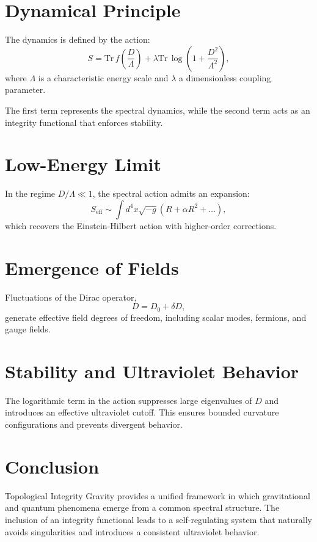 \documentclass[11pt,a4paper]{article}
\begin{document}
\section{Dynamical Principle}

The dynamics is defined by the action:
\begin{equation}
S = \mathrm{Tr}\, f\left(\frac{D}{\Lambda}\right) + \lambda \mathrm{Tr}\,\log\left(1 + \frac{D^2}{\Lambda^2}\right),
\end{equation}
where $\Lambda$ is a characteristic energy scale and $\lambda$ a dimensionless coupling parameter.

The first term represents the spectral dynamics, while the second term acts as an integrity functional that enforces stability.

\section{Low-Energy Limit}

In the regime $D/\Lambda \ll 1$, the spectral action admits an expansion:
\begin{equation}
S_{\mathrm{eff}} \sim \int d^4x \sqrt{-g} \left( R + \alpha R^2 + \dots \right),
\end{equation}
which recovers the Einstein-Hilbert action with higher-order corrections.

\section{Emergence of Fields}

Fluctuations of the Dirac operator,
\begin{equation}
D = D_0 + \delta D,
\end{equation}
generate effective field degrees of freedom, including scalar modes, fermions, and gauge fields.

\section{Stability and Ultraviolet Behavior}

The logarithmic term in the action suppresses large eigenvalues of $D$ and introduces an effective ultraviolet cutoff. This ensures bounded curvature configurations and prevents divergent behavior.

\section{Conclusion}

Topological Integrity Gravity provides a unified framework in which gravitational and quantum phenomena emerge from a common spectral structure. The inclusion of an integrity functional leads to a self-regulating system that naturally avoids singularities and introduces a consistent ultraviolet behavior.
\end{document}
